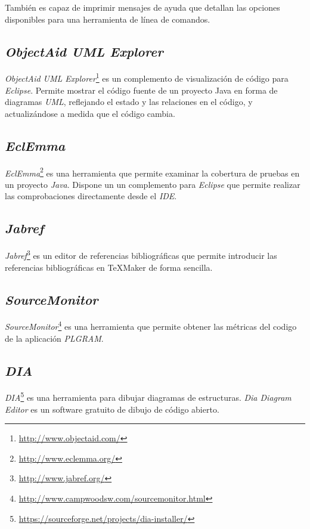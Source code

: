 También es capaz de imprimir mensajes de ayuda que detallan las opciones disponibles para una herramienta de línea de comandos.

\subsection{\textit{ObjectAid UML Explorer}}
\textit{ObjectAid UML Explorer}\footnote{\url{http://www.objectaid.com/}} es un complemento de visualización de código para \textit{Eclipse}.
Permite mostrar el código fuente de un proyecto Java en forma de diagramas \textit{UML}, reflejando el estado y las relaciones en el código, y actualizándose a medida que el código cambia.


\subsection{\textit{EclEmma}}
\textit{EclEmma}\footnote{\url{http://www.eclemma.org/}} es una herramienta que permite examinar la cobertura de pruebas en un proyecto \textit{Java}.
Dispone un un complemento para \textit{Eclipse} que permite realizar las comprobaciones directamente desde el \textit{IDE}.

\subsection{\textit{Jabref}}
\textit{Jabref}\footnote{\url{http://www.jabref.org/}} es un editor de referencias bibliográficas que permite introducir las referencias bibliográficas en \TeX{}Maker de forma sencilla.

\subsection{\textit{SourceMonitor}}
\textit{SourceMonitor}\footnote{\url{http://www.campwoodsw.com/sourcemonitor.html}} es una herramienta que permite obtener las métricas del codigo de la aplicación \textit{PLGRAM}.

\subsection{\textit{DIA}}
\textit{DIA}\footnote{\url{https://sourceforge.net/projects/dia-installer/}} es una herramienta para dibujar diagramas de estructuras. \textit{Dia Diagram Editor} es un software gratuito de dibujo de código abierto.




